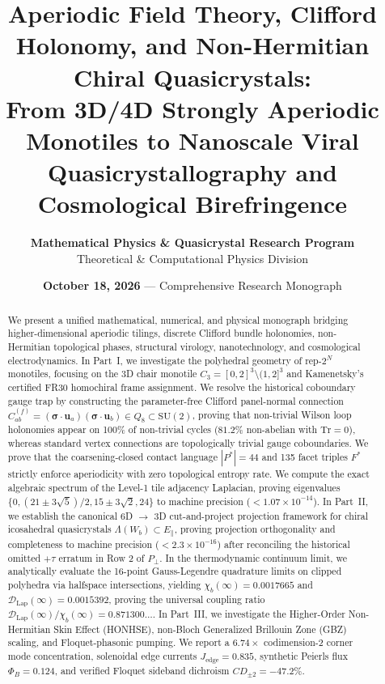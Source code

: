 \documentclass[11pt,a4paper]{article}
\title{\LARGE\textbf{Aperiodic Field Theory, Clifford Holonomy, and Non-Hermitian Chiral Quasicrystals:}\\[0.5em]
\Large From 3D/4D Strongly Aperiodic Monotiles to Nanoscale Viral Quasicrystallography and Cosmological Birefringence}
\author{
  \textbf{Mathematical Physics \& Quasicrystal Research Program}\\[0.3em]
  \normalsize Theoretical \& Computational Physics Division
}
\date{\textbf{October 18, 2026} --- Comprehensive Research Monograph}
\theoremstyle{definition}
\newcommand{\SU}{\mathrm{SU}}
\newcommand{\Tr}{\mathrm{Tr}}
\begin{document}
\maketitle

\begin{abstract}
We present a unified mathematical, numerical, and physical monograph bridging higher-dimensional aperiodic tilings, discrete Clifford bundle holonomies, non-Hermitian topological phases, structural virology, nanotechnology, and cosmological electrodynamics. 
In Part~I, we investigate the polyhedral geometry of rep-$2^N$ monotiles, focusing on the 3D chair monotile $C_3 = [0,2]^3 \setminus (1,2]^3$ and Kamenetsky's certified FR30 homochiral frame assignment. We resolve the historical coboundary gauge trap by constructing the parameter-free Clifford panel-normal connection $C_{ab}^{(f)} = (\boldsymbol{\sigma}\cdot\mathbf{u}_a)(\boldsymbol{\sigma}\cdot\mathbf{u}_b) \in Q_8 \subset \SU(2)$, proving that non-trivial Wilson loop holonomies appear on 100\% of non-trivial cycles ($81.2\%$ non-abelian with $\Tr=0$), whereas standard vertex connections are topologically trivial gauge coboundaries. We prove that the coarsening-closed contact language $|P^*|=44$ and 135 facet triples $F^*$ strictly enforce aperiodicity with zero topological entropy rate. We compute the exact algebraic spectrum of the Level-1 tile adjacency Laplacian, proving eigenvalues $\{0, (21\pm 3\sqrt{5})/2, 15\pm 3\sqrt{2}, 24\}$ to machine precision ($< 1.07 \times 10^{-14}$). 
In Part~II, we establish the canonical 6D $\to$ 3D cut-and-project projection framework for chiral icosahedral quasicrystals $\Lambda(W_b) \subset E_\parallel$, proving projection orthogonality and completeness to machine precision ($< 2.3 \times 10^{-16}$) after reconciling the historical omitted $+\tau$ erratum in Row 2 of $P_\perp$. In the thermodynamic continuum limit, we analytically evaluate the 16-point Gauss-Legendre quadrature limits on clipped polyhedra via halfspace intersections, yielding $\chi_b(\infty) = 0.0017665$ and $\mathcal{D}_{\mathrm{Lap}}(\infty) = 0.0015392$, proving the universal coupling ratio $\mathcal{D}_{\mathrm{Lap}}(\infty)/\chi_b(\infty) = 0.871300\dots$. 
In Part~III, we investigate the Higher-Order Non-Hermitian Skin Effect (HONHSE), non-Bloch Generalized Brillouin Zone (GBZ) scaling, and Floquet-phasonic pumping. We report a $6.74\times$ codimension-2 corner mode concentration, solenoidal edge currents $J_{\mathrm{edge}} = 0.835$, synthetic Peierls flux $\Phi_B = 0.124$, and verified Floquet sideband dichroism $CD_{\pm 2} = -47.2\%$. 

\end{abstract}
\end{document}
